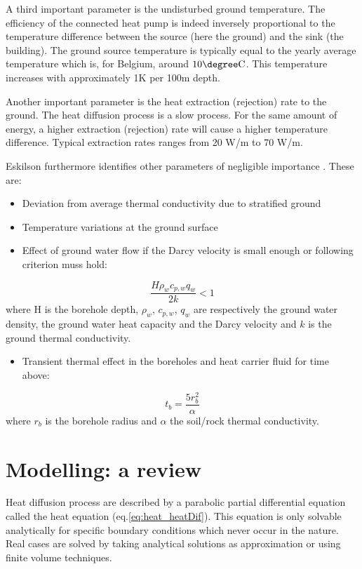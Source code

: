\documentclass[a4paper,oneside,11pt]{report}
\begin{document}
A third important parameter is the undisturbed ground temperature. The efficiency of the connected heat pump is indeed inversely proportional to the temperature difference between the source (here the ground) and the sink (the building). The ground source temperature is typically equal to the yearly average temperature which is, for Belgium, around $10 \mathrm{\degree C}$. This temperature increases with approximately 1K per 100m depth.

Another important parameter is the heat extraction (rejection) rate to the ground. The heat diffusion process is a slow process. For the same amount of energy, a higher extraction (rejection) rate will cause a higher temperature difference. Typical extraction rates ranges from 20 W/m to 70 W/m.

Eskilson furthermore identifies other parameters of negligible importance \cite{esk87}. These are:
\begin{itemize}
	\item Deviation from average thermal conductivity due to stratified ground
	\item Temperature variations at the ground surface
	\item Effect of ground water flow if the Darcy velocity is small enough or following criterion muss hold:
\end{itemize}
\begin{equation} \label{eq:bf_darcy}
	\frac{H \rho_w c_{p,w} q_w}{2 k} < 1
\end{equation}
where H is the borehole depth, $\rho_w$, $c_{p,w}$, $q_w$ are respectively the ground water density,  the ground water heat capacity and the Darcy velocity and $k$ is the ground thermal conductivity.
\begin{itemize}
	\item Transient thermal effect in the boreholes and heat carrier fluid for time above:
\end{itemize}
\begin{equation} \label{eq:bf_traTim}
	t_b = \frac{5 r_b^2}{\alpha}
\end{equation}
where $r_b$ is the borehole radius and $\alpha$ the soil/rock thermal conductivity.

\section{Modelling: a review} \label{sec:bf_mod}

Heat diffusion process are described by a parabolic partial differential equation called the heat equation (eq.\ref{eq:heat_heatDif}). This equation is only solvable analytically for specific boundary conditions which never occur in the nature. Real cases are solved by taking analytical solutions as approximation or using finite volume techniques. 
\end{document}
